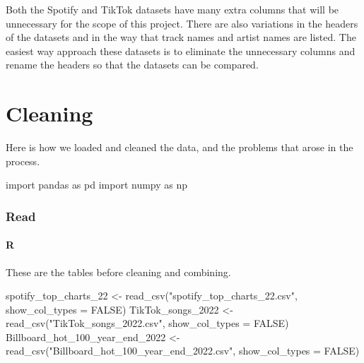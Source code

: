 \documentclass[
  letterpaper,
  DIV=11,
  numbers=noendperiod]{scrreprt}
\newenvironment{Shaded}{\begin{snugshade}}{\end{snugshade}}
\newcommand{\AttributeTok}[1]{\textcolor[rgb]{0.40,0.45,0.13}{#1}}
\newcommand{\ConstantTok}[1]{\textcolor[rgb]{0.56,0.35,0.01}{#1}}
\newcommand{\FunctionTok}[1]{\textcolor[rgb]{0.28,0.35,0.67}{#1}}
\newcommand{\ImportTok}[1]{\textcolor[rgb]{0.00,0.46,0.62}{#1}}
\newcommand{\NormalTok}[1]{\textcolor[rgb]{0.00,0.23,0.31}{#1}}
\newcommand{\OtherTok}[1]{\textcolor[rgb]{0.00,0.23,0.31}{#1}}
\newcommand{\StringTok}[1]{\textcolor[rgb]{0.13,0.47,0.30}{#1}}
\begin{document}
Both the Spotify and TikTok datasets have many extra columns that will
be unnecessary for the scope of this project. There are also variations
in the headers of the datasets and in the way that track names and
artist names are listed. The easiest way approach these datasets is to
eliminate the unnecessary columns and rename the headers so that the
datasets can be compared.


\chapter*{Cleaning}\label{cleaning}


Here is how we loaded and cleaned the data, and the problems that arose
in the process.

\begin{Shaded}
\begin{Highlighting}[]
\ImportTok{import}\NormalTok{ pandas }\ImportTok{as}\NormalTok{ pd}
\ImportTok{import}\NormalTok{ numpy }\ImportTok{as}\NormalTok{ np}
\end{Highlighting}
\end{Shaded}

\subsection*{Read}\label{read}

\subsubsection{R}

These are the tables before cleaning and combining.

\begin{Shaded}
\begin{Highlighting}[]
\NormalTok{spotify\_top\_charts\_22 }\OtherTok{\textless{}{-}} \FunctionTok{read\_csv}\NormalTok{(}\StringTok{"spotify\_top\_charts\_22.csv"}\NormalTok{, }\AttributeTok{show\_col\_types =} \ConstantTok{FALSE}\NormalTok{)}
\NormalTok{TikTok\_songs\_2022 }\OtherTok{\textless{}{-}} \FunctionTok{read\_csv}\NormalTok{(}\StringTok{"TikTok\_songs\_2022.csv"}\NormalTok{, }\AttributeTok{show\_col\_types =} \ConstantTok{FALSE}\NormalTok{)}
\NormalTok{Billboard\_hot\_100\_year\_end\_2022 }\OtherTok{\textless{}{-}} \FunctionTok{read\_csv}\NormalTok{(}\StringTok{"Billboard\_hot\_100\_year\_end\_2022.csv"}\NormalTok{, }\AttributeTok{show\_col\_types =} \ConstantTok{FALSE}\NormalTok{)}
\end{Highlighting}
\end{Shaded}
\end{document}

